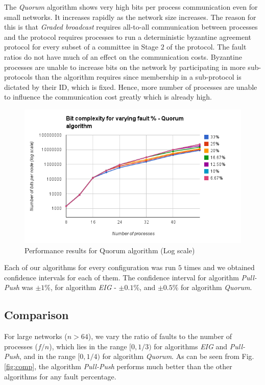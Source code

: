 The \textit{Quorum} algorithm shows very high bits per process communication even for small networks. It increases rapidly as the network size increases. The reason for this is that \textit{Graded broadcast} requires all-to-all communication between processes and the protocol requires processes to run a deterministic byzantine agreement protocol for every subset of a committee in Stage $2$ of the protocol. The fault ratios do not have much of an effect on the communication costs. Byzantine processes are unable to increase bits on the network by participating in more sub-protocols than the algorithm requires since membership in a sub-protocol is dictated by their ID, which is fixed. Hence, more number of processes are unable to influence the communication cost greatly which is already high.  
\begin{figure}[ht]
 \centering
\includegraphics[scale=0.4]{quorum}
\caption{Performance results for Quorum algorithm (Log scale)}
 \label{fig:quorum}
\end{figure}

Each of our algorithms for every configuration was run $5$ times and we obtained confidence intervals for each of them. The confidence interval for algorithm \textit{Pull-Push} was $\pm 1\%$, for algorithm \textit{EIG} - $\pm 0.1\%$, and $\pm 0.5\%$ for algorithm \textit{Quorum}.

\subsection{Comparison}
For large networks ($n > 64$), we vary the ratio of faults to the number of processes ($f/n$), which lies in the range $[0, 1/3)$ for algorithms \textit{EIG} and \textit{Pull-Push}, and in the range $[0, 1/4)$ for algorithm \textit{Quorum}.
        As can be seen from Fig. \ref{fig:comp}, the algorithm \textit{Pull-Push} performs much better than the other algorithms for any fault percentage.

